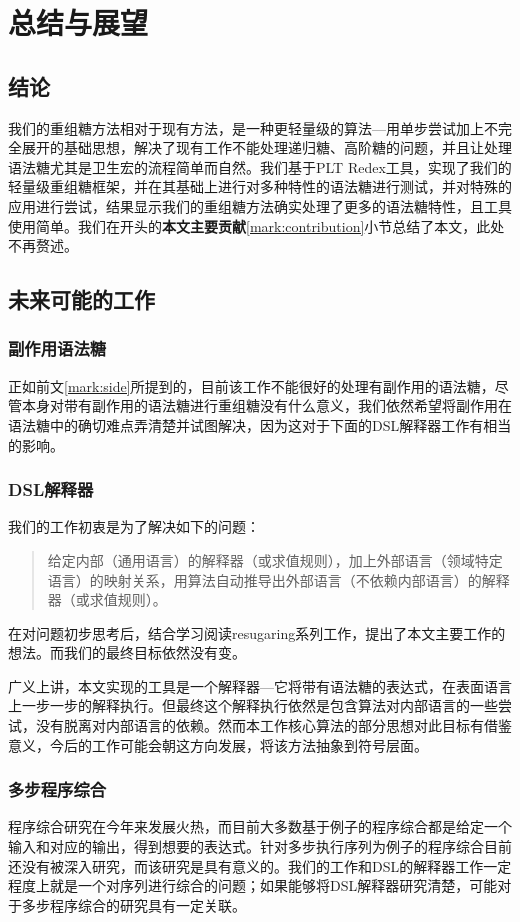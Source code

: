 \pagestyle{fancy}
\normalsize
\linespread{1.5}\selectfont
\label{mark:chapter6}\chapter{总结与展望}
\section{结论}
我们的重组糖方法相对于现有方法，是一种更轻量级的算法---用单步尝试加上不完全展开的基础思想，解决了现有工作不能处理递归糖、高阶糖的问题，并且让处理语法糖尤其是卫生宏的流程简单而自然。我们基于PLT Redex工具，实现了我们的轻量级重组糖框架，并在其基础上进行对多种特性的语法糖进行测试，并对特殊的应用进行尝试，结果显示我们的重组糖方法确实处理了更多的语法糖特性，且工具使用简单。我们在开头的{\bfseries 本文主要贡献}\ref{mark:contribution}小节总结了本文，此处不再赘述。



\section{未来可能的工作}

\subsection{副作用语法糖}

正如前文\ref{mark:side}所提到的，目前该工作不能很好的处理有副作用的语法糖，尽管本身对带有副作用的语法糖进行重组糖没有什么意义，我们依然希望将副作用在语法糖中的确切难点弄清楚并试图解决，因为这对于下面的DSL解释器工作有相当的影响。

\subsection{DSL解释器}
我们的工作初衷是为了解决如下的问题：

\begin{quote}
	给定内部（通用语言）的解释器（或求值规则），加上外部语言（领域特定语言）的映射关系，用算法自动推导出外部语言（不依赖内部语言）的解释器（或求值规则）。
\end{quote}

在对问题初步思考后，结合学习阅读resugaring系列工作，提出了本文主要工作的想法。而我们的最终目标依然没有变。

广义上讲，本文实现的工具是一个解释器---它将带有语法糖的表达式，在表面语言上一步一步的解释执行。但最终这个解释执行依然是包含算法对内部语言的一些尝试，没有脱离对内部语言的依赖。然而本工作核心算法的部分思想对此目标有借鉴意义，今后的工作可能会朝这方向发展，将该方法抽象到符号层面。

\subsection{多步程序综合}

程序综合研究在今年来发展火热，而目前大多数基于例子的程序综合都是给定一个输入和对应的输出，得到想要的表达式。针对多步执行序列为例子的程序综合目前还没有被深入研究，而该研究是具有意义的。我们的工作和DSL的解释器工作一定程度上就是一个对序列进行综合的问题；如果能够将DSL解释器研究清楚，可能对于多步程序综合的研究具有一定关联。

\clearpage
